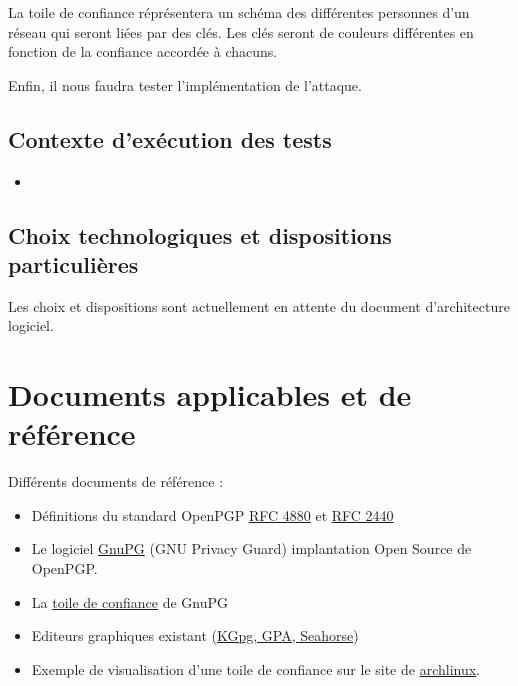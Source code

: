 \documentclass{../res/univ-projet}
\begin{document}
La toile de confiance réprésentera un schéma des différentes personnes d'un réseau qui seront liées par des clés.
Les clés seront de couleurs différentes en fonction de la confiance accordée à chacuns.

Enfin, il nous faudra tester l'implémentation de l'attaque. 

\subsection{Contexte d'exécution des tests}
\begin{itemize}
 \item
\end{itemize}

\subsection{Choix technologiques et dispositions particulières}
Les choix et dispositions sont actuellement en attente du document d'architecture logiciel.



\section{Documents applicables et de référence}
Différents documents de référence :
\begin{itemize}
\item Définitions du standard OpenPGP \href{file:../../ressources/openPGP/rfc4880-en.pdf}{RFC 4880}
  et \href{file:../../ressources/openPGP/rfc2440-fr.pdf}{RFC 2440}
\item Le logiciel \href{https://www.gnupg.org/}{GnuPG} (GNU Privacy Guard) implantation Open Source
  de OpenPGP.
\item La \href{https://www.gnupg.org/gph/fr/manual.html#AEN541}{toile de confiance} de GnuPG
\item Editeurs graphiques existant 
  (\href{http://www.gnupg.org/related_software/frontends.en.html}{KGpg, GPA, Seahorse})
\item Exemple de visualisation d'une toile de confiance sur le site de 
  \href{https://www.archlinux.org/master-keys/#visualization}{archlinux}.
\end{itemize}
\end{document}
